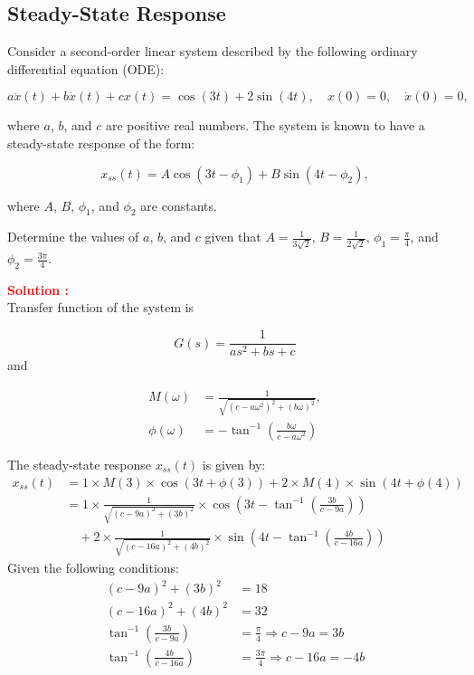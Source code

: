 \documentclass[12pt]{article}
\begin{document}
\subsection{Steady-State Response}

Consider a second-order linear system described by the following ordinary differential equation (ODE):

            \begin{equation*}
                a\ddot{x}(t) + b\dot{x}(t) + cx(t) = \cos(3t) + 2\sin(4t), \quad x(0) = 0, \quad \dot{x}(0) = 0,
            \end{equation*}
            
            where \( a \), \( b \), and \( c \) are positive real numbers. The system is known to have a steady-state response of the form:

            \begin{equation*}
                x_{ss}(t) = A\cos(3t - \phi_1) + B\sin(4t - \phi_2),
            \end{equation*}
            
            where \( A \), \( B \), \( \phi_1 \), and \( \phi_2 \) are constants.
            
            Determine the values of \( a \), \( b \), and \( c \) given that \( A = \frac{1}{3\sqrt{2}} \), \( B = \frac{1}{2\sqrt{2}} \), \( \phi_1 = \frac{\pi}{4} \), and \( \phi_2 = \frac{3\pi}{4} \).


\textbf{\textcolor{red}{Solution :}} \\
Transfer function of the system is

\begin{equation}
    G(s) = \frac{1}{as^2 + bs + c}
\end{equation}
and

\begin{align*}
    M(\omega) &= \frac{1}{\sqrt{(c-a\omega^2)^2 + (b\omega)^2}}, \\
    \phi(\omega) &= -\tan^{-1}\left(\frac{b\omega}{c-a\omega^2}\right)
\end{align*}

The steady-state response \( x_{ss}(t) \) is given by:
\begin{align*}
x_{ss}(t) &= 1 \times M(3) \times \cos(3t + \phi(3)) + 2 \times M(4) \times \sin(4t + \phi(4)) \\
&= 1 \times \frac{1}{\sqrt{(c-9a)^2 + (3b)^2}} \times \cos\left(3t - \tan^{-1}\left(\frac{3b}{c-9a}\right)\right) \\
&\quad + 2 \times \frac{1}{\sqrt{(c-16a)^2 + (4b)^2}} \times \sin\left(4t - \tan^{-1}\left(\frac{4b}{c-16a}\right)\right)
\end{align*}
Given the following conditions:
\begin{align*}
    (c-9a)^2 + (3b)^2 &= 18 \\
    (c-16a)^2 + (4b)^2 &= 32 \\
    \tan^{-1}\left(\frac{3b}{c-9a}\right) &= \frac{\pi}{4} \Rightarrow c-9a = 3b \\
   \tan^{-1}\left(\frac{4b}{c-16a}\right) &= \frac{3\pi}{4} \Rightarrow c-16a = -4b
\end{align*}
\end{document}
